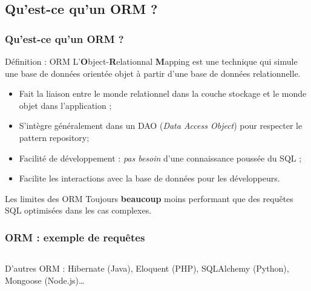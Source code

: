 	\subsection{Qu'est-ce qu'un ORM ?}
	\begin{frame}
		\frametitle{Qu'est-ce qu'un ORM ?}

		\begin{block}{Définition : ORM}
			L'\textbf{O}bject-\textbf{R}elationnal \textbf{M}apping est une technique qui simule une base de données orientée objet à partir d'une base de données relationnelle.
		\end{block}

		\begin{itemize}
			\footnotesize
			\item Fait la liaison entre le monde relationnel dans la couche stockage et le monde objet dans l'application ;
			\item S'intègre généralement dans un DAO (\textit{Data Access Object}) pour respecter le pattern repository;
			\item Facilité de développement : \textit{pas besoin} d'une connaissance poussée du SQL ;
			\item Facilite les interactions avec la base de données pour les développeurs.
		\end{itemize}

		\begin{alertblock}{Les limites des ORM}
			Toujours \textbf{beaucoup} moins performant que des requêtes SQL optimisées dans les cas complexes.
		\end{alertblock}
	\end{frame}

	\begin{frame}
		\frametitle{ORM : exemple de requêtes}

		\begin{listing}[H]
			\inputminted[fontsize=\tiny, linenos=true]{java}{code/eloquent.java}
			\caption{Quelques requêtes basiques avec un ORM imaginaire.}
		\end{listing}

		\scriptsize{D'autres ORM : Hibernate (Java), Eloquent (PHP), SQLAlchemy (Python), Mongoose (Node.js)\dots}
	\end{frame}
